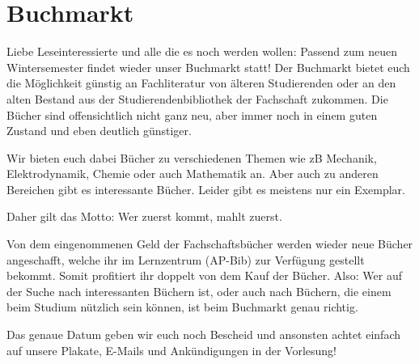 \section{Buchmarkt}
\begin{multicols*}{2}
Liebe Leseinteressierte und alle die es noch werden wollen: Passend zum neuen Wintersemester findet wieder unser Buchmarkt statt! Der Buchmarkt bietet euch die Möglichkeit günstig an Fachliteratur von älteren Studierenden oder an den alten Bestand aus der Studierendenbibliothek der Fachschaft zukommen. Die Bücher sind offensichtlich nicht ganz neu, aber immer noch in einem guten Zustand und eben deutlich günstiger. 

Wir bieten euch dabei Bücher zu verschiedenen Themen wie zB Mechanik, Elektrodynamik, Chemie oder auch Mathematik an. Aber auch zu anderen Bereichen gibt es interessante Bücher. Leider gibt es meistens nur ein Exemplar.

Daher gilt das Motto: Wer zuerst kommt, mahlt zuerst. 

Von dem eingenommenen Geld der Fachschaftsbücher werden wieder neue Bücher angeschafft, welche ihr im Lernzentrum (AP-Bib) zur Verfügung gestellt bekommt. Somit profitiert ihr doppelt von dem Kauf der Bücher. Also: Wer auf der Suche nach interessanten Büchern ist, oder auch nach Büchern, die einem beim Studium nützlich sein können, ist beim Buchmarkt genau richtig.

Das genaue Datum geben wir euch noch Bescheid und ansonsten achtet einfach auf unsere Plakate, E-Mails und Ankündigungen in der Vorlesung!

\end{multicols*}


